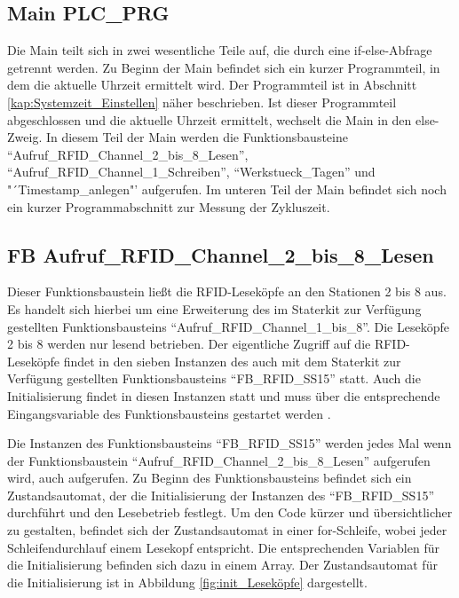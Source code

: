 \subsection{Main PLC\_PRG}
\label{kap:Main_PLC_PRG}
Die Main teilt sich in zwei wesentliche Teile auf, die durch eine if-else-Abfrage getrennt werden. Zu Beginn der Main befindet sich ein kurzer Programmteil, in dem die aktuelle Uhrzeit ermittelt wird. Der Programmteil ist in Abschnitt \ref{kap:Systemzeit_Einstellen} näher beschrieben. Ist dieser Programmteil abgeschlossen und die aktuelle Uhrzeit ermittelt, wechselt die Main in den else-Zweig. In diesem Teil der Main werden die Funktionsbausteine "`Aufruf\_RFID\_Channel\_2\_bis\_8\_Lesen"', "`Aufruf\_RFID\-\_\-Chan\-nel\-\_1\_Schreiben"', "`Werkstueck\_Tagen"' und "´Timestamp\_anlegen"' aufgerufen. Im unteren Teil der Main befindet sich noch ein kurzer Programmabschnitt zur Messung der Zykluszeit. 

\subsection{FB Aufruf\_RFID\_Channel\_2\_bis\_8\_Lesen} \label{kap:FB_Lesen}
Dieser Funktionsbaustein ließt die RFID-Leseköpfe an den Stationen 2 bis 8 aus. Es handelt sich hierbei um eine Erweiterung des im Staterkit zur Verfügung gestellten Funktionsbausteins "`Aufruf\_RFID\_Channel\_1\_bis\_8"'. Die Leseköpfe 2 bis 8 werden nur lesend betrieben. Der eigentliche Zugriff auf die RFID-Leseköpfe findet in den sieben Instanzen des auch mit dem Staterkit zur Verfügung gestellten Funktionsbausteins "`FB\_RFID\_SS15"' statt. Auch die Initialisierung findet in diesen Instanzen statt und muss über die entsprechende Eingangsvariable des Funktionsbausteins gestartet werden .

Die Instanzen des Funktionsbausteins "`FB\_RFID\_SS15"' werden jedes Mal wenn der Funktionsbaustein "`Aufruf\_RFID\_Chan\-nel\_2\_bis\-\_8\_Lesen"' aufgerufen wird, auch aufgerufen. Zu Beginn des Funktionsbausteins befindet sich ein Zustandsautomat, der die Initialisierung der Instanzen des "`FB\_RFID\-\_SS15"' durchführt und den Lesebetrieb festlegt. Um den Code kürzer und übersichtlicher zu gestalten, befindet sich der Zustandsautomat in einer for-Schleife, wobei jeder Schleifendurchlauf einem Lesekopf entspricht. Die entsprechenden Variablen für die Initialisierung befinden sich dazu in einem Array. Der Zustandsautomat für die Initialisierung ist in Abbildung \ref{fig:init_Leseköpfe} dargestellt.

